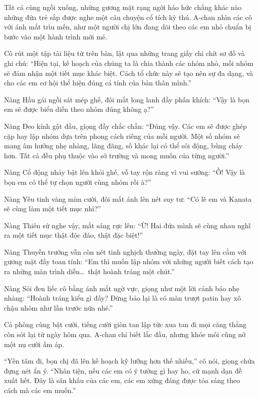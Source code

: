 \documentclass[../main.tex]{subfiles}
\begin{document}
Tất cả cùng ngồi xuống, những gương mặt rạng ngời háo hức chẳng khác nào những đứa trẻ sắp được nghe một câu chuyện cổ tích kỳ thú. A-chan nhìn các cô với ánh mắt trìu mến, như một người chị lớn đang dõi theo các em nhỏ chuẩn bị bước vào một hành trình mới mẻ.

Cô rút một tập tài liệu từ trên bàn, lật qua những trang giấy chi chít sơ đồ và ghi chú: ``Hiện tại, kế hoạch của chúng ta là chia thành các nhóm nhỏ, mỗi nhóm sẽ đảm nhận một tiết mục khác biệt. Cách tổ chức này sẽ tạo nên sự đa dạng, và cho các em cơ hội thể hiện đúng cá tính của bản thân mình.''

Nàng Hầu gái ngồi sát mép ghế, đôi mắt long lanh đầy phấn khích: ``Vậy là bọn em sẽ được biểu diễn theo nhóm đúng không ạ?''

Nàng Đeo kính gật đầu, giọng đầy chắc chắn: ``Đúng vậy. Các em sẽ được ghép cặp hay lập nhóm dựa trên phong cách riêng của mỗi người. Một số nhóm sẽ mang âm hưởng nhẹ nhàng, lãng đãng, số khác lại có thể sôi động, bùng cháy hơn. Tất cả đều phụ thuộc vào sở trường và mong muốn của từng người.''

Nàng Cổ động nhảy bật lên khỏi ghế, vỗ tay rộn ràng vì vui sướng: ``Ồ! Vậy là bọn em có thể tự chọn người cùng nhóm rồi à?''

Nàng Yêu tinh vàng mỉm cười, đôi mắt ánh lên nét suy tư: ``Có lẽ em và Kanata sẽ cùng làm một tiết mục nhỉ?''

Nàng Thiên sứ nghe vậy, mắt sáng rực lên: ``Ừ! Hai đứa mình sẽ cùng nhau nghĩ ra một tiết mục thật độc đáo, thật đặc biệt!''

Nàng Thuyền trưởng vẫn còn nét tinh nghịch thường ngày, đặt tay lên cằm với gương mặt đầy toan tính: ``Em thì muốn lập nhóm với những người biết cách tạo ra những màn trình diễn\dots\ thật hoành tráng một chút.''

Nàng Sói đen liếc cô bằng ánh mắt ngờ vực, giọng như một lời cảnh báo nhẹ nhàng: ``Hoành tráng kiểu gì đấy? Đừng bảo lại là có màn trượt patin hay xô chậu nhôm như lần trước nữa nhé.''

Cả phòng cùng bật cười, tiếng cười giòn tan lập tức xua tan đi mọi căng thẳng còn sót lại từ ngày hôm qua. A-chan chỉ biết lắc đầu, nhưng khóe môi cũng nở một nụ cười ấm áp.

``Yên tâm đi, bọn chị đã lên kế hoạch kỹ lưỡng hơn thế nhiều,'' cô nói, giọng chứa đựng nét ẩn ý. ``Nhân tiện, nếu các em có ý tưởng gì hay ho, cứ mạnh dạn đề xuất hết. Đây là sân khấu của các em, các em xứng đáng được tỏa sáng theo cách mà các em muốn.''
\end{document}
